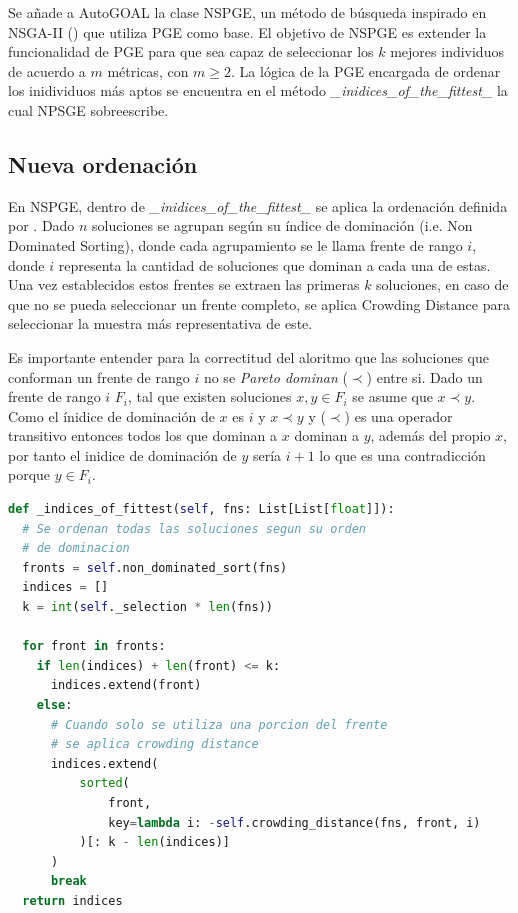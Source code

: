Se a\~nade a AutoGOAL la clase NSPGE, un m\'etodo de b\'usqueda inspirado en NSGA-II (\cite{deb2002fast}) que utiliza PGE como base. El objetivo de NSPGE es extender la funcionalidad de PGE para que sea capaz de seleccionar los $k$ mejores individuos de acuerdo a $m$ m\'etricas, con $m \ge 2$. La l\'ogica de la PGE encargada de ordenar los inidividuos m\'as aptos se encuentra en el m\'etodo \textit{\_inidices\_of\_the\_fittest\_} la cual NPSGE sobreescribe.

\subsection{Nueva ordenaci\'on}

En NSPGE, dentro de \textit{\_inidices\_of\_the\_fittest\_} se aplica la ordenaci\'on definida por \cite{deb2002fast}. Dado $n$ soluciones se  agrupan seg\'un su \'indice de dominaci\'on (i.e. Non Dominated Sorting), donde cada agrupamiento se le llama frente de rango $i$, donde $i$ representa la cantidad de soluciones que dominan a cada una de estas. Una vez establecidos estos frentes se extraen las primeras $k$ soluciones, en caso de que no se pueda seleccionar un frente completo, se aplica Crowding Distance para seleccionar la muestra m\'as representativa de este.

Es importante entender para la correctitud del aloritmo  que las soluciones que conforman un frente de rango $i$ no se \textit{Pareto dominan} ($\prec$) entre si.
Dado un frente de rango $i$ $F_i$, tal que existen soluciones $x, y \in F_i$ se asume que $x \prec y$. Como el \'inidice de dominaci\'on de $x$ es $i$ y $x \prec y$ y ($\prec$) es una operador transitivo entonces todos los que dominan a $x$ dominan a $y$, adem\'as del propio $x$, por tanto el inidice de dominaci\'on de $y$ ser\'ia $i+1$ lo que es una contradicci\'on porque $y \in F_i$. 

\begin{lstlisting}[language=Python]
def _indices_of_fittest(self, fns: List[List[float]]):
  # Se ordenan todas las soluciones segun su orden
  # de dominacion
  fronts = self.non_dominated_sort(fns)
  indices = []
  k = int(self._selection * len(fns))

  for front in fronts:
    if len(indices) + len(front) <= k:
      indices.extend(front)
    else:
      # Cuando solo se utiliza una porcion del frente
      # se aplica crowding distance
      indices.extend(
          sorted(
              front,
              key=lambda i: -self.crowding_distance(fns, front, i)
          )[: k - len(indices)]
      )
      break
  return indices
\end{lstlisting}

